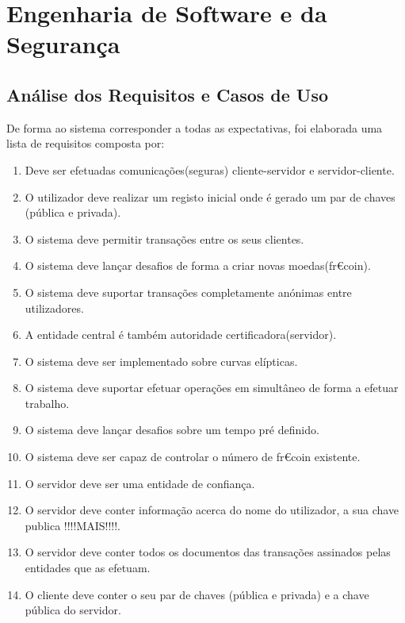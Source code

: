 \chapter{Engenharia de Software e da Segurança}
\label{chap:engsoft}

\section{Análise dos Requisitos e Casos de Uso}
\label{sec:analreq}
De forma ao sistema corresponder a todas as expectativas, foi elaborada uma lista de requisitos composta por:

\begin{enumerate}
    \item Deve ser efetuadas comunicações(seguras) cliente-servidor e servidor-cliente.
    
    \item O utilizador deve realizar um registo inicial onde é gerado um par de chaves (pública e privada).
    
    \item O sistema deve permitir transações entre os seus clientes.
    
    \item O sistema deve lançar desafios de forma a criar novas moedas(fr€coin).
    
    \item O sistema deve suportar transações completamente anónimas entre utilizadores.
    
    \item A entidade central é também autoridade certificadora(servidor).
    
    \item O sistema deve ser implementado sobre curvas elípticas.
    
    \item O sistema deve suportar efetuar operações em simultâneo de forma a efetuar trabalho.
    
    \item O sistema deve lançar desafios sobre um tempo pré definido.
    
    \item O sistema deve ser capaz de controlar o número de fr€coin existente.
    
    \item O servidor deve ser uma entidade de confiança.
    
    \item O servidor deve conter informação acerca do nome do utilizador, a sua chave publica !!!!MAIS!!!!.
    
    \item O servidor deve conter todos os documentos das transações assinados pelas entidades que as efetuam.
    
    \item O cliente deve conter o seu par de chaves (pública e privada) e a chave pública do servidor.
    
\end{enumerate}

